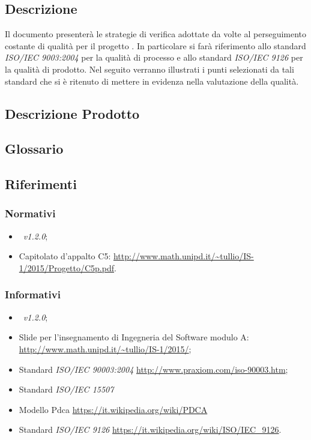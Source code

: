 \documentclass[12pt,a4paper]{article}
\begin{document}
\subsection{Descrizione}
Il documento presenterà  le strategie di verifica adottate da \nomeGruppo{} volte al perseguimento costante di  qualità per il progetto \prjL{}. In particolare si farà riferimento allo standard \textit{ISO/IEC 9003:2004} per la qualità di processo e allo standard \textit{ISO/IEC 9126} per la qualità di prodotto. Nel seguito verranno illustrati i punti selezionati da tali standard che si è ritenuto di mettere in evidenza nella valutazione della qualità.

\subsection{Descrizione Prodotto}
\descrizioneProdotto

\subsection{Glossario}
\glossarioPrint

\subsection{Riferimenti}

\subsubsection{Normativi}
\begin{itemize}
	\item \NdP\ \textit{v1.2.0};
	\item Capitolato d'appalto C5: \url{http://www.math.unipd.it/~tullio/IS-1/2015/Progetto/C5p.pdf}.
\end{itemize}

\subsubsection{Informativi}
\begin{itemize}
	\item \PdP\ \textit{v1.2.0};
	\item Slide per l'insegnamento di Ingegneria del Software modulo A: \url{http://www.math.unipd.it/~tullio/IS-1/2015/};
	\item Standard \textit{ISO/IEC 90003:2004} \url{http://www.praxiom.com/iso-90003.htm};
	\item Standard \textit{ISO/IEC 15507} 
	\item Modello Pdca \url{https://it.wikipedia.org/wiki/PDCA}
	\item Standard \textit{ISO/IEC 9126} \url{https://it.wikipedia.org/wiki/ISO/IEC_9126}.
\end{itemize}
\end{document}
